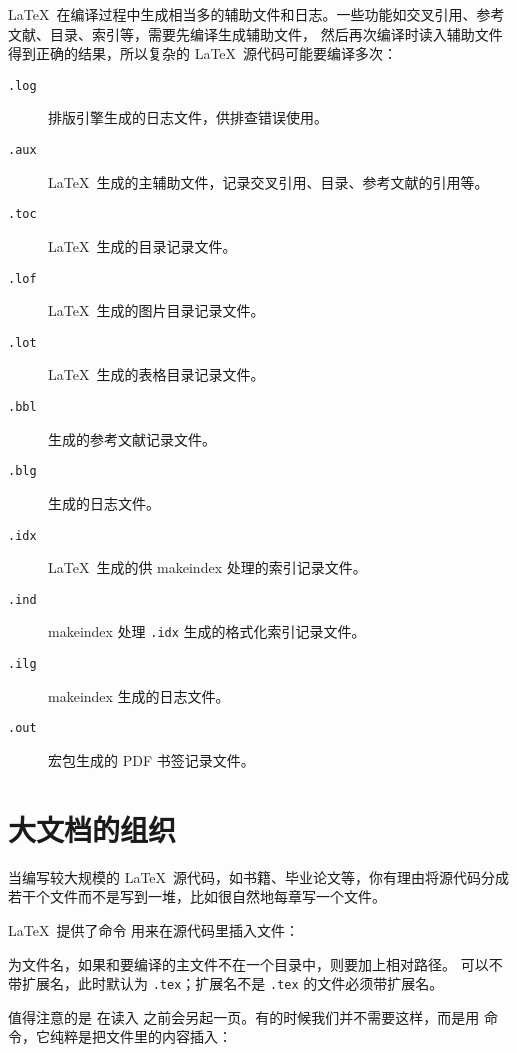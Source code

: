 \LaTeX\ 在编译过程中生成相当多的辅助文件和日志。一些功能如交叉引用、参考文献、目录、索引等，需要先编译生成辅助文件，
然后再次编译时读入辅助文件得到正确的结果，所以复杂的 \LaTeX\ 源代码可能要编译多次：
\begin{description}
  \item[\texttt{.log}] 排版引擎生成的日志文件，供排查错误使用。
  \item[\texttt{.aux}] \LaTeX\ 生成的主辅助文件，记录交叉引用、目录、参考文献的引用等。
  \item[\texttt{.toc}] \LaTeX\ 生成的目录记录文件。
  \item[\texttt{.lof}] \LaTeX\ 生成的图片目录记录文件。
  \item[\texttt{.lot}] \LaTeX\ 生成的表格目录记录文件。
  \item[\texttt{.bbl}]  生成的参考文献记录文件。
  \item[\texttt{.blg}]  生成的日志文件。
  \item[\texttt{.idx}] \LaTeX\ 生成的供 makeindex 处理的索引记录文件。
  \item[\texttt{.ind}] makeindex 处理 \texttt{.idx} 生成的格式化索引记录文件。
  \item[\texttt{.ilg}] makeindex 生成的日志文件。
  \item[\texttt{.out}]  宏包生成的 PDF 书签记录文件。
\end{description}

\section{大文档的组织}\label{sec:latex-multi-files}

当编写较大规模的 \LaTeX\ 源代码，如书籍、毕业论文等，你有理由将源代码分成若干个文件而不是写到一堆，比如很自然地每章写一个文件。

\LaTeX\ 提供了命令  用来在源代码里插入文件：
\begin{command}
\end{command}
 为文件名，如果和要编译的主文件不在一个目录中，则要加上相对路径。
 可以不带扩展名，此时默认为 \texttt{.tex}；扩展名不是 \texttt{.tex} 的文件必须带扩展名。

值得注意的是  在读入  之前会另起一页。有的时候我们并不需要这样，而是用  命令，它纯粹是把文件里的内容插入：
\begin{command}
\end{command}

